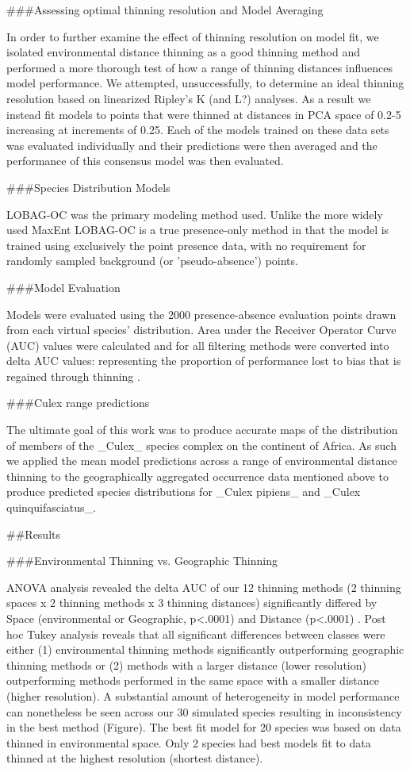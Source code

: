 ###Assessing optimal thinning resolution and Model Averaging

In order to further examine the effect of thinning resolution on model fit, we isolated environmental distance thinning as a good thinning method and performed a more thorough test of how a range of thinning distances influences model performance. We attempted, unsuccessfully, to determine an ideal thinning resolution based on linearized Ripley’s K (and L?) analyses. As a result we instead fit models to points that were thinned at distances in PCA space of 0.2-5 increasing at increments of 0.25. Each of the models trained on these data sets was evaluated individually and their predictions were then averaged and the performance of this consensus model was then evaluated.

###Species Distribution Models 

LOBAG-OC \cite{Drake:2014fk} was the primary modeling method used. Unlike the more widely used MaxEnt LOBAG-OC is a true presence-only method in that the model is trained using exclusively the point presence data, with no requirement for randomly sampled background (or 'pseudo-absence') points. 

###Model Evaluation

Models were evaluated using the 2000 presence-absence evaluation points drawn from each virtual species’ distribution. Area under the Receiver Operator Curve (AUC) values were calculated and for all filtering methods were converted into delta AUC values: representing the proportion of performance lost to bias that is regained through thinning \cite{Fourcade:2014ka}.

###Culex range predictions 

The ultimate goal of this work was to produce accurate maps of the distribution of members of the _Culex_ species complex on the continent of Africa. As such we applied the mean model predictions across a range of environmental distance thinning to the geographically aggregated occurrence data mentioned above to produce predicted species distributions for _Culex pipiens_ and _Culex quinquifasciatus_. 

##Results

###Environmental Thinning vs. Geographic Thinning

ANOVA analysis revealed the delta AUC of our 12 thinning methods (2 thinning spaces x 2 thinning methods x 3 thinning distances) significantly differed by Space (environmental or Geographic, p<.0001) and Distance (p<.0001) . Post hoc Tukey analysis reveals that all significant differences between classes were either (1) environmental thinning methods significantly outperforming geographic thinning methods or (2) methods with a larger distance (lower resolution) outperforming methods performed in the same space with a smaller distance (higher resolution). A substantial amount of heterogeneity in model performance can nonetheless be seen across our 30 simulated species resulting in inconsistency in the best method (Figure). The best fit model for 20 species was based on data thinned in environmental space. Only 2 species had best models fit to data thinned at the highest resolution (shortest distance). 

